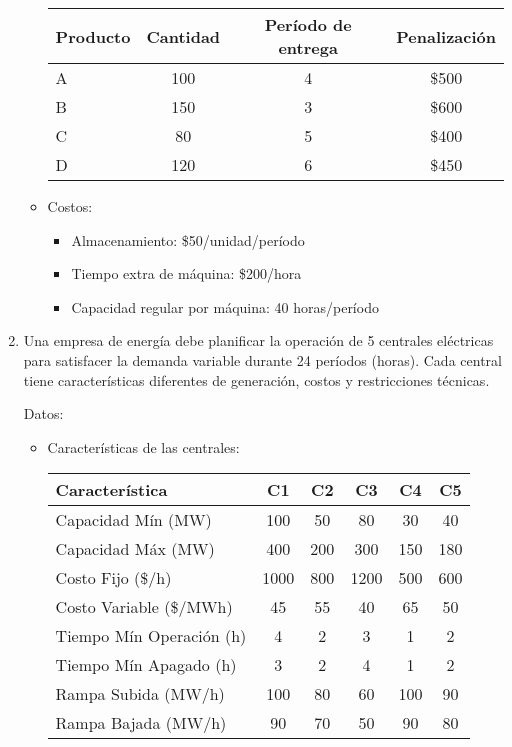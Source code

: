 \documentclass[12pt]{article}
\begin{document}
\begin{enumerate}
\begin{itemize}
\begin{center}
\begin{tabular}{lccc}
\toprule
Producto & Cantidad & Período de entrega & Penalización \\
\midrule
A & 100 & 4 & \$500 \\
B & 150 & 3 & \$600 \\
C & 80 & 5 & \$400 \\
D & 120 & 6 & \$450 \\
\bottomrule
\end{tabular}
\end{center}

\item Costos:
  \begin{itemize}
  \item Almacenamiento: \$50/unidad/período
  \item Tiempo extra de máquina: \$200/hora
  \item Capacidad regular por máquina: 40 horas/período
  \end{itemize}
\end{itemize}

\item Una empresa de energía debe planificar la operación de 5 centrales eléctricas para satisfacer la demanda variable durante 24 períodos (horas). Cada central tiene características diferentes de generación, costos y restricciones técnicas.

Datos:
\begin{itemize}
\item Características de las centrales:

\begin{center}
\begin{tabular}{lccccc}
\toprule
Característica & C1 & C2 & C3 & C4 & C5 \\
\midrule
Capacidad Mín (MW) & 100 & 50 & 80 & 30 & 40 \\
Capacidad Máx (MW) & 400 & 200 & 300 & 150 & 180 \\
Costo Fijo (\$/h) & 1000 & 800 & 1200 & 500 & 600 \\
Costo Variable (\$/MWh) & 45 & 55 & 40 & 65 & 50 \\
Tiempo Mín Operación (h) & 4 & 2 & 3 & 1 & 2 \\
Tiempo Mín Apagado (h) & 3 & 2 & 4 & 1 & 2 \\
Rampa Subida (MW/h) & 100 & 80 & 60 & 100 & 90 \\
Rampa Bajada (MW/h) & 90 & 70 & 50 & 90 & 80 \\
\bottomrule
\end{tabular}
\end{center}


\end{itemize}
\end{enumerate}
\end{document}

